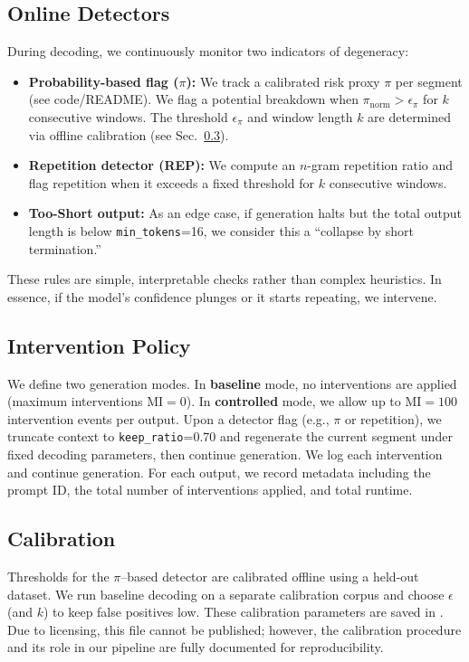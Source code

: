 \documentclass{article}
\begin{document}
\subsection{Online Detectors}
During decoding, we continuously monitor two indicators of degeneracy:
\begin{itemize}
  \item \textbf{Probability-based flag ($\pi$):} We track a calibrated risk proxy $\pi$ per segment (see code/README). We flag a potential breakdown when $\pi_{\text{norm}} > \epsilon_{\pi}$ for $k$ consecutive windows. The threshold $\epsilon_{\pi}$ and window length $k$ are determined via offline calibration (see Sec.~\ref{sec:calibration}).
  \item \textbf{Repetition detector (REP):} We compute an $n$-gram repetition ratio and flag repetition when it exceeds a fixed threshold for $k$ consecutive windows.
  \item \textbf{Too-Short output:} As an edge case, if generation halts but the total output length is below \texttt{min\_tokens}=16, we consider this a ``collapse by short termination.''
\end{itemize}
These rules are simple, interpretable checks rather than complex heuristics. In essence, if the model's confidence plunges or it starts repeating, we intervene.

\subsection{Intervention Policy}
We define two generation modes. In \textbf{baseline} mode, no interventions are applied (maximum interventions $\text{MI}=0$). In \textbf{controlled} mode, we allow up to $\text{MI}=100$ intervention events per output. Upon a detector flag (e.g., $\pi$ or repetition), we truncate context to \texttt{keep\_ratio}=0.70 and regenerate the current segment under fixed decoding parameters, then continue generation. We log each intervention and continue generation. For each output, we record metadata including the prompt ID, the total number of interventions applied, and total runtime.

\subsection{Calibration}
\label{sec:calibration}
Thresholds for the $\pi$--based detector are calibrated offline using a held-out dataset. We run baseline decoding on a separate calibration corpus and choose $\epsilon$ (and $k$) to keep false positives low. These calibration parameters are saved in . Due to licensing, this file cannot be published; however, the calibration procedure and its role in our pipeline are fully documented for reproducibility.
\end{document}
